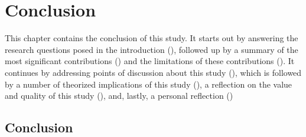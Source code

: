 \chapter{Conclusion}
\label{chap:conclusion}



This chapter contains the conclusion of this study. 
It starts out by answering the research questions posed in the introduction (), followed up by a summary of the most significant contributions () and the limitations of these contributions ().
It continues by addressing points of discussion about this study (), which is followed by a number of theorized implications of this study (), a reflection on the value and quality of this study
(), and, lastly, a personal reflection ()



\section{Conclusion}
\label{sec:conclusion}

